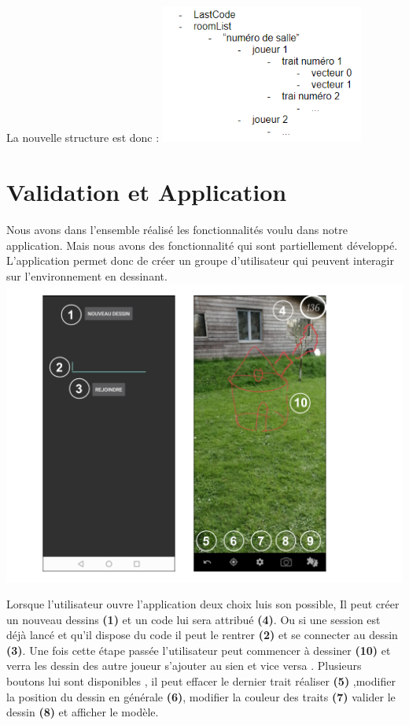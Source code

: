 \documentclass[12pt]{article}
\begin{document}
	\newline
	La nouvelle structure est donc :
	\newline
	\includegraphics[width=0.5\textwidth]{Capture.png}
	\newline
\section{Validation et Application}
\par
Nous avons dans l'ensemble réalisé les fonctionnalités voulu dans notre application. Mais nous avons des fonctionnalité qui sont partiellement développé. L'application permet donc de créer un groupe d'utilisateur qui peuvent interagir sur l'environnement en dessinant.
\newline
\includegraphics[width=1\textwidth]{dessin1.png}
\newline
\par
Lorsque l'utilisateur ouvre l'application deux choix luis son possible, Il peut créer un nouveau dessins \textbf{(1)} et un code lui sera attribué \textbf{(4)}. Ou si une session est déjà lancé et qu'il dispose du code il peut le rentrer \textbf{(2)} et se connecter au dessin \textbf{(3)}.
Une fois cette étape passée l'utilisateur peut commencer à dessiner \textbf{(10)} et verra les dessin des autre joueur s'ajouter au sien et vice versa .
Plusieurs boutons lui sont disponibles , il peut effacer le dernier trait réaliser \textbf{(5)} ,modifier la position du dessin en générale \textbf{(6)}, modifier la couleur des traits \textbf{(7)} valider le dessin \textbf{(8)} et afficher le modèle.
\end{document}
